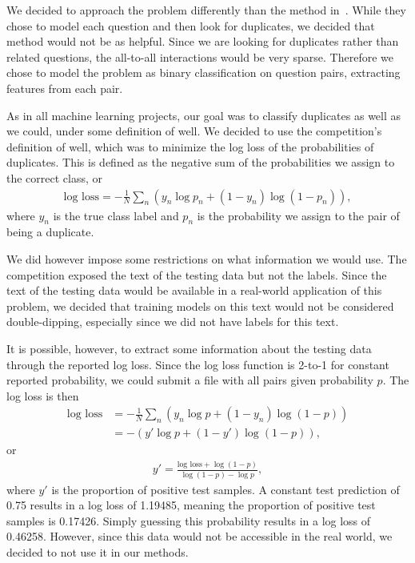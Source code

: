 \documentclass{article} %
\begin{document}
We decided to approach the problem differently than the method in~\cite{Zhang2015}. While they chose to model each question and then look for duplicates, we decided that method would not be as helpful. Since we are looking for duplicates rather than related questions, the all-to-all interactions would be very sparse. Therefore we chose to model the problem as binary classification on question pairs, extracting features from each pair. 

As in all machine learning projects, our goal was to classify duplicates as well as we could, under some definition of well. We decided to use the competition's definition of well, which was to minimize the log loss of the probabilities of duplicates. This is defined as the negative sum of the probabilities we assign to the correct class, or
\begin{align}
\text{log loss} = -\frac{1}{N}\sum_n \left(y_n\log p_n + (1-y_n)\log(1-p_n)\right),
\end{align} 
where $y_n$ is the true class label and $p_n$ is the probability we assign to the pair of being a duplicate. 

We did however impose some restrictions on what information we would use. The competition exposed the text of the testing data but not the labels. Since the text of the testing data would be available in a real-world application of this problem, we decided that training models on this text would not be considered double-dipping, especially since we did not have labels for this text. 

It is possible, however, to extract some information about the testing data through the reported log loss. Since the log loss function is 2-to-1 for constant reported probability, we could submit a file with all pairs given probability $p$. The log loss is then
\begin{align}
\text{log loss} &= -\frac{1}{N}\sum_n \left(y_n\log p + (1-y_n)\log(1-p)\right)
	\nonumber\\
&= -\left(y'\log p + (1-y')\log(1-p)\right),
\end{align}
or 
\begin{align}
y' = \frac{\text{log loss} + \log(1-p)}{\log(1-p)-\log p},
\end{align}
where $y'$ is the proportion of positive test samples. A constant test prediction of 0.75 results in a log loss of 1.19485, meaning the proportion of positive test samples is 0.17426. Simply guessing this probability results in a log loss of 0.46258. However, since this data would not be accessible in the real world, we decided to not use it in our methods. 
\end{document}
